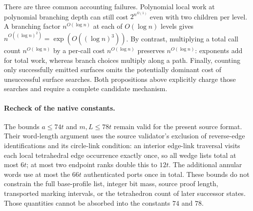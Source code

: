 There are three common accounting failures.  Polynomial local work at
polynomial branching depth can still cost $2^{n^{\Omega(1)}}$ even with
two children per level.  A branching factor $n^{O(\log n)}$ at each of
$O(\log n)$ levels gives
$n^{O((\log n)^2)}=\exp(O((\log n)^3))$.  By contrast, multiplying a
total call count $n^{O(\log n)}$ by a per-call cost
$n^{O(\log n)}$ preserves $n^{O(\log n)}$: exponents add for total
work, whereas branch choices multiply along a path.  Finally, counting
only successfully emitted surfaces omits the potentially dominant cost
of unsuccessful surface searches.  Both propositions above explicitly
charge those searches and require a complete candidate mechanism.

\paragraph{Recheck of the native constants.}
The bounds $a\leq74t$ and $m,L\leq78t$ remain valid for the present
source format.  Their word-length argument uses the source validator's
exclusion of reverse-edge identifications and its circle-link condition:
an interior edge-link traversal visits each local tetrahedral edge
occurrence exactly once, so all wedge lists total at most $6t$; at most
two endpoint ranks double this to $12t$.  The additional annular words
use at most the $66t$ authenticated ports once in total.  These bounds
do not constrain the full base-profile list, integer bit mass, source
proof length, transported marking intervals, or the tetrahedron count
of later successor states.  Those quantities cannot be absorbed into
the constants $74$ and $78$.
